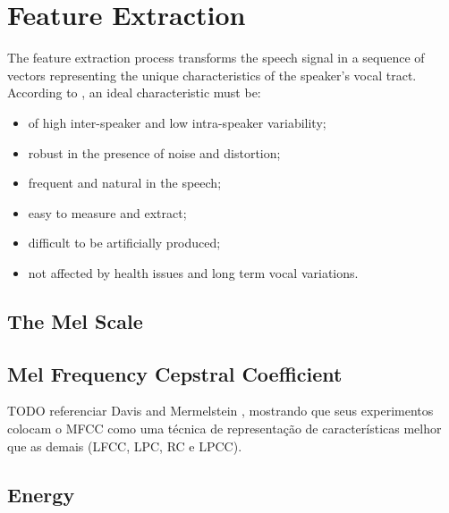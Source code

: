 \chapter{Feature Extraction}

The feature extraction process transforms the speech signal in a sequence of vectors
representing the unique characteristics of the speaker's vocal tract. According
to \autocite{wolf.1972}, an ideal characteristic must be:

\begin{itemize}\itemsep0pt
    \item of high inter-speaker and low intra-speaker variability;
    \item robust in the presence of noise and distortion;
    \item frequent and natural in the speech;
    \item easy to measure and extract;
    \item difficult to be artificially produced;
    \item not affected by health issues and long term vocal variations.
\end{itemize}


\section{The Mel Scale}


\section{Mel Frequency Cepstral Coefficient}

TODO referenciar Davis and Mermelstein \autocite{davis.mermelstein.1980},
mostrando que seus experimentos colocam o MFCC como uma técnica de representação
de características melhor que as demais (LFCC, LPC, RC e LPCC).


\section{Energy}